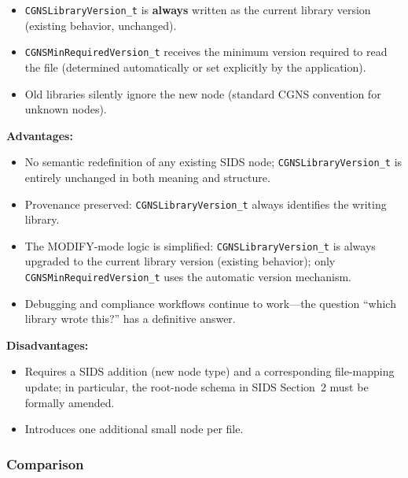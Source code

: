 \documentclass[11pt,letterpaper]{article}
\begin{document}
\begin{itemize}[leftmargin=2em]
\item \texttt{CGNSLibraryVersion\_t} is \textbf{always} written as
  the current library version (existing behavior, unchanged).
\item \texttt{CGNSMinRequiredVersion\_t} receives the minimum
  version required to read the file (determined automatically or set
  explicitly by the application).
\item Old libraries silently ignore the new node (standard CGNS
  convention for unknown nodes).
\end{itemize}

\textbf{Advantages:}
\begin{itemize}[leftmargin=2em]
\item No semantic redefinition of any existing SIDS node;
  \texttt{CGNSLibraryVersion\_t} is entirely unchanged in both
  meaning and structure.
\item Provenance preserved: \texttt{CGNSLibraryVersion\_t} always
  identifies the writing library.
\item The MODIFY-mode logic is simplified:
  \texttt{CGNSLibraryVersion\_t} is always upgraded to the current
  library version (existing behavior); only
  \texttt{CGNSMinRequiredVersion\_t} uses the automatic version
  mechanism.
\item Debugging and compliance workflows continue to work---the
  question ``which library wrote this?'' has a definitive answer.
\end{itemize}

\textbf{Disadvantages:}
\begin{itemize}[leftmargin=2em]
\item Requires a SIDS addition (new node type) and a corresponding
  file-mapping update; in particular, the root-node schema in
  SIDS Section~2 must be formally amended.
\item Introduces one additional small node per file.
\end{itemize}

\subsubsection{Comparison}
\end{document}
